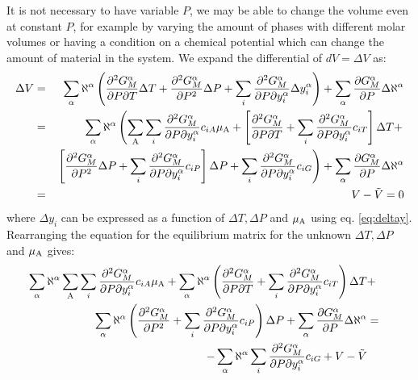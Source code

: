 \documentclass[12pt]{article}
\begin{document}
It is not necessary to have variable $P$, we may be able to change the
volume even at constant $P$, for example by varying the amount of
phases with different molar volumes or having a condition on a
chemical potential which can change the amount of material in the
system.  We expand the differential of $dV = \Delta V$ as:
\begin{eqnarray}
\Delta V &=& \sum_{\alpha} \aleph^{\alpha} \left(\frac{\partial^2 G^{\alpha}_M}{\partial P\partial T} \Delta T + 
\frac{\partial^2 G^{\alpha}_M}{\partial P^2} \Delta P + 
\sum_i\frac{\partial^2 G^{\alpha}_M}{\partial P\partial y^{\alpha}_{i}} \Delta y^{\alpha}_i\right) +
\sum_{\alpha} \frac{\partial G^{\alpha}_M}{\partial P} \Delta\aleph^{\alpha}\nonumber\\&=& 
\sum_{\alpha} \aleph^{\alpha} \left(
\sum_{\rm A}\sum_i\frac{\partial^2 G^{\alpha}_M}{\partial P\partial y^{\alpha}_{i}}c_{iA}\mu_{\rm A}+
\left[\frac{\partial^2 G^{\alpha}_M}{\partial P\partial T}+
\sum_i\frac{\partial^2 G^{\alpha}_M}{\partial P\partial y^{\alpha}_{i}}c_{iT}\right]\Delta T+\right.\nonumber\\&&
\left.\left[\frac{\partial^2 G^{\alpha}_M}{\partial P^2} \Delta P+
\sum_i\frac{\partial^2 G^{\alpha}_M}{\partial P\partial y^{\alpha}_{i}}c_{iP}\right]\Delta P + \sum_i\frac{\partial^2 G^{\alpha}_M}{\partial P\partial y^{\alpha}_{i}}c_{iG}\right)
+\sum_{\alpha} \frac{\partial G^{\alpha}_M}{\partial P} \Delta\aleph^{\alpha}\nonumber\\&=&
V - \tilde V = 0\label{eq:vcond}
\end{eqnarray}
where $\Delta y_i$ can be expressed as a function of $\Delta T, \Delta
P$ and $\mu_{\rm A}$ using eq. \ref{eq:deltay}.  Rearranging the equation
for the equilibrium matrix for the unknown $\Delta T, \Delta P$
and $\mu_{\rm A}$ gives:
\begin{eqnarray}
\sum_{\alpha} \aleph^{\alpha}
\sum_{\rm A}\sum_i\frac{\partial^2 G^{\alpha}_M}{\partial P\partial y^{\alpha}_{i}}c_{iA}\mu_{\rm A}+
\sum_{\alpha} \aleph^{\alpha}
\left(\frac{\partial^2 G^{\alpha}_M}{\partial P\partial T}+
\sum_i\frac{\partial^2 G^{\alpha}_M}{\partial P\partial y^{\alpha}_{i}}c_{iT}\right)\Delta T&+&\nonumber\\
\sum_{\alpha} \aleph^{\alpha}
\left(\frac{\partial^2 G^{\alpha}_M}{\partial P^2} +
\sum_i\frac{\partial^2 G^{\alpha}_M}{\partial P\partial y^{\alpha}_{i}}c_{iP}\right)\Delta P
+\sum_{\alpha} \frac{\partial G^{\alpha}_M}{\partial P} \Delta\aleph^{\alpha}&=&\nonumber\\
-\sum_{\alpha}\aleph^{\alpha}\sum_i\frac{\partial^2 G^{\alpha}_M}{\partial P\partial y^{\alpha}_{i}}c_{iG}
+V - \tilde V\label{eq:vcond2}
\end{eqnarray}
\end{document}
